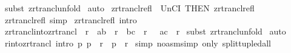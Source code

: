 \begin{isabellebody}
%
\isadelimproof
%
\endisadelimproof
%
\isatagproof
{}\isamarkupfalse%
\ {\isacharparenleft}subst\ zrtrancl{\isacharunderscore}unfold{\isacharparenright}\isanewline
{}\isamarkupfalse%
\ auto\isanewline
{}\isamarkupfalse%
%
\endisatagproof
{\isafoldproof}%
%
\isadelimproof
\isanewline
%
\endisadelimproof
\isanewline
{}\isamarkupfalse%
\ zrtrancl{\isacharunderscore}refl\ {\isacharequal}\ UnCI\ {\isacharbrackleft}THEN\ zrtrancl{\isacharunderscore}refl{}{\isacharbrackright}\ \isanewline
\isanewline
{}\isamarkupfalse%
\ zrtrancl{\isacharunderscore}refl\ {\isacharbrackleft}simp{\isacharbrackright}\isanewline
{}\isamarkupfalse%
\ zrtrancl{\isacharunderscore}refl\ {\isacharbrackleft}intro{\isacharbang}{\isacharbrackright}\isanewline
\isanewline
{}\isamarkupfalse%
\ zrtrancl{\isacharunderscore}into{\isacharunderscore}zrtrancl\ {\isacharcolon}\ {\isachardoublequoteopen}{\isacharbang}{\isacharbang}r{\isachardot}\ {\isacharbrackleft}{\isacharbar}\ {\isacharparenleft}a{\isacharcomma}b{\isacharparenright}\ {\isacharcolon}\ r{\isacharpercent}{\isacharasterisk}{\isacharsemicolon}\ \ {\isacharparenleft}b{\isacharcomma}c{\isacharparenright}\ {\isacharcolon}\ r\ {\isacharbar}{\isacharbrackright}\ {\isacharequal}{\isacharequal}{\isachargreater}\ {\isacharparenleft}a{\isacharcomma}c{\isacharparenright}\ {\isacharcolon}\ r{\isacharpercent}{\isacharasterisk}{\isachardoublequoteclose}\isanewline
%
\isadelimproof
%
\endisadelimproof
%
\isatagproof
{}\isamarkupfalse%
\ {\isacharparenleft}subst\ zrtrancl{\isacharunderscore}unfold{\isacharparenright}\isanewline
{}\isamarkupfalse%
\ auto\isanewline
{}\isamarkupfalse%
%
\endisatagproof
{\isafoldproof}%
%
\isadelimproof
\isanewline
%
\endisadelimproof
\isanewline
\isanewline
{}\isamarkupfalse%
\ r{\isacharunderscore}into{\isacharunderscore}zrtrancl\ {\isacharbrackleft}intro{\isacharbrackright}{\isacharcolon}\ {\isachardoublequoteopen}{\isacharbang}{\isacharbang}p{\isachardot}\ p\ {\isacharcolon}\ r\ {\isacharequal}{\isacharequal}{\isachargreater}\ p\ {\isacharcolon}\ r{\isacharpercent}{\isacharasterisk}{\isachardoublequoteclose}\isanewline
%
\isadelimproof
%
\endisadelimproof
%
\isatagproof
{}\isamarkupfalse%
\ {\isacharparenleft}simp\ {\isacharparenleft}no{\isacharunderscore}asm{\isacharunderscore}simp{\isacharparenright}\ only{\isacharcolon}\ split{\isacharunderscore}tupled{\isacharunderscore}all{\isacharparenright}\isanewline
{}\isamarkupfalse%

\end{isabellebody}
